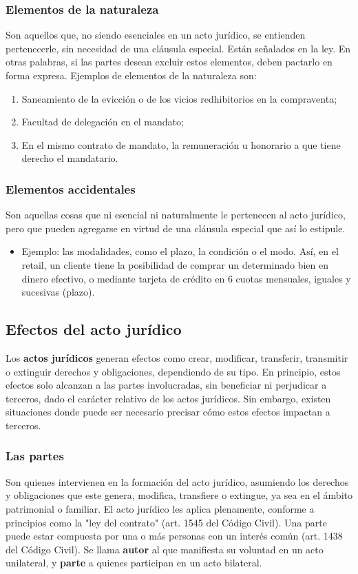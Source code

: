 \documentclass{templateNote}
\begin{document}
\subsubsection{Elementos de la naturaleza}
Son aquellos que, no siendo esenciales en un acto jurídico, se entienden pertenecerle, sin necesidad de una cláusula especial. Están señalados en la ley. En otras palabras, si las partes desean excluir estos elementos, deben pactarlo en forma expresa.
Ejemplos de elementos de la naturaleza son:
\begin{enumerate}[label=\roman*.]
    \item Saneamiento de la evicción o de los vicios redhibitorios en la compraventa;
    \item Facultad de delegación en el mandato;
    \item En el mismo contrato de mandato, la remuneración u honorario a que tiene derecho el mandatario.
\end{enumerate}

\subsubsection{Elementos accidentales}
Son aquellas cosas que ni esencial ni naturalmente le pertenecen al acto jurídico, pero que pueden agregarse en virtud de una cláusula especial que así lo estipule.

\begin{itemize}
    \item Ejemplo: las modalidades, como el plazo, la condición o el modo. Así, en el retail, un cliente tiene la posibilidad de comprar un determinado bien en dinero efectivo, o mediante tarjeta de crédito en 6 cuotas mensuales, iguales y sucesivas (plazo).
\end{itemize}


\subsection{Efectos del acto jurídico}
Los \textbf{actos jurídicos} generan efectos como crear, modificar, transferir, transmitir o extinguir derechos y obligaciones, dependiendo de su tipo. En principio, estos efectos solo alcanzan a las partes involucradas, sin beneficiar ni perjudicar a terceros, dado el carácter relativo de los actos jurídicos. Sin embargo, existen situaciones donde puede ser necesario precisar cómo estos efectos impactan a terceros.

\subsubsection{Las partes}
Son quienes intervienen en la formación del acto jurídico, asumiendo los derechos y obligaciones que este genera, modifica, transfiere o extingue, ya sea en el ámbito patrimonial o familiar. El acto jurídico les aplica plenamente, conforme a principios como la "ley del contrato" (art. 1545 del Código Civil). Una parte puede estar compuesta por una o más personas con un interés común (art. 1438 del Código Civil). 
Se llama \textbf{autor} al que manifiesta su voluntad en un acto unilateral, y \textbf{parte} a quienes participan en un acto bilateral.
\end{document}
